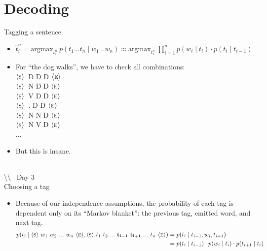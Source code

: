 \documentclass[11pt,letterpaper]{article}
\newcommand{\bs}{\textbackslash}
\newcommand{\ngramstart}{\ensuremath{\langle \textsc{s} \rangle}}
\newcommand{\ngramend}{\ensuremath{\langle \textsc{e} \rangle}}
\begin{document}
\section{Decoding}

Tagging a sentence

\begin{itemize}
  \item $\hat{t}_i^n = \text{argmax}_{t_1^n}~p(t_1 ... t_n \mid w_1 ... w_n) \approx \text{argmax}_{t_1^n}~\prod_{i=1}^n p(w_i \mid t_i) \cdot p(t_i \mid t_{i-1})$
  \item For ``the dog walks'', we have to check all combinations: \vspace{2mm} \\
        \ngramstart\ D D D \ngramend  \vspace{2mm} \\
        \ngramstart\ N D D \ngramend  \vspace{2mm} \\
        \ngramstart\ V D D \ngramend  \vspace{2mm} \\
        \ngramstart\ . D D \ngramend  \vspace{2mm} \\
        \ngramstart\ N N D \ngramend  \vspace{2mm} \\
        \ngramstart\ N V D \ngramend  \vspace{2mm} \\
        ...
  \item But this is insane.
\end{itemize}



~\\ \bs\bs~ Day 3 \\

Choosing a tag

\begin{itemize}
  \item Because of our independence assumptions, the probability of each tag is dependent only on its ``Markov blanket'': the previous tag, emitted word, and next tag.  
    \begin{align*} p(t_i \mid \ngramstart~w_1~w_2~...~w_n~\ngramend, \ngramstart~t_1~t_2~...~\mathbf{t_{i-1}~t_{i+1}}~...~t_n~\ngramend)
       &= p(t_i \mid t_{i-1}, w_i, t_{i+1}) \\
       &= p(t_i \mid t_{i-1}) \cdot p(w_i \mid t_i) \cdot p(t_{i+1} \mid t_i)
    \end{align*}
\end{itemize}
\end{document}

